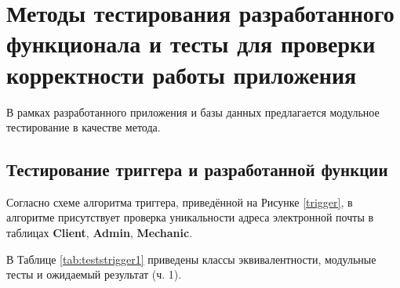 \section{Методы тестирования разработанного функционала и тесты для проверки корректности работы приложения}

В рамках разработанного приложения и базы данных предлагается модульное тестирование в качестве метода.

\subsection{Тестирование триггера и разработанной функции}

Согласно схеме алгоритма триггера, приведённой на Рисунке \ref{trigger}, в алгоритме присутствует проверка уникальности адреса электронной почты в таблицах \textbf{Client}, \textbf{Admin}, \textbf{Mechanic}. 

В Таблице \ref{tab:teststrigger1} приведены классы эквивалентности, модульные тесты и ожидаемый результат (ч. 1).


